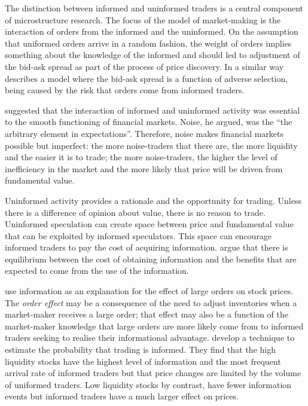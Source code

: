 \documentclass[preprint,12pt,authoryear]{elsarticle}
\begin{document}
The distinction between informed and uninformed traders is a central component of microstructure research.  The focus of the \citet{Kyle1985Continuous} model of market-making is the interaction of orders from the informed and the uninformed.  On the assumption that uniformed orders arrive in a random fashion, the weight of orders implies something about the knowledge of the informed and should led to adjustment of the bid-ask spread as part of the process of price discovery.  In a similar way \citet{glosten1985bid} describes a model where the bid-ask spread is a function of adverse selection, being caused by the risk that orders come from informed traders.  

\citet[p.529]{BlackNoise} suggested that the interaction of informed and uninformed activity was essential to the smooth functioning of financial markets. Noise, he argued, was the  ``the arbitrary element in expectations''. Therefore, noise makes financial markets possible but imperfect: the more noise-traders that there are, the more liquidity and the easier it is to trade; the more noise-traders, the higher the level of inefficiency in the market and the more likely that price will be driven from fundamental value. 

Uninformed activity provides a rationale and the opportunity for trading. Unless there is a difference of opinion about value, there is no reason to trade. Uninformed speculation can create space between price and fundamental value that can be exploited by informed speculators.  This space can encourage informed traders to pay the cost of acquiring information.  \citet{Grossman1980Impossibility} argue that there is equilibrium between the cost of obtaining information and the benefits that are expected to come from the use of the information. 

\citet{EasleyPIN} use information as an explanation for the effect of large orders on stock prices.  The \emph{order effect} may be a consequence of the need to adjust inventories when a market-maker receives a large order; that effect may also be a function of the market-maker knowledge that large orders are more likely come from to informed traders seeking to realise their informational advantage.  \citet{EasleyPIN2} develop a technique to estimate the probability that trading is informed.  They find that the high liquidity stocks have the highest level of information and the most frequent arrival rate of informed traders but that price changes are limited by the volume of uniformed traders. Low liquidity stocks by contrast, have fewer information events but informed traders have a much larger effect on prices. 
\end{document}
